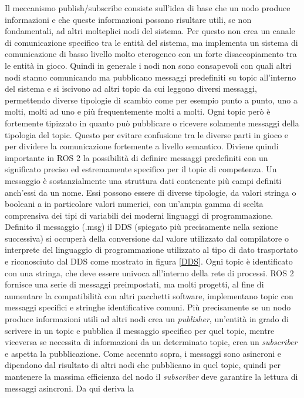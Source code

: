 \documentclass[a4paper,11 pt,oneside]{book}
\theoremstyle{definition}
\begin{document}
Il meccanismo publish/subscribe consiste sull'idea di base che un nodo produce informazioni e che queste informazioni possano risultare utili, se non fondamentali, ad altri molteplici nodi del sistema. Per questo non crea un canale di comunicazione specifico tra le entità del sistema, ma implementa un sistema di comunicazione di basso livello molto eterogeneo con un forte disaccopiamento tra le entità in gioco.
Quindi in generale i nodi non sono consapevoli con quali altri nodi stanno comunicando ma pubblicano messaggi predefiniti su topic all’interno del sistema e si iscivono ad altri topic da cui leggono diversi messaggi, permettendo diverse tipologie di scambio come per esempio punto a punto, uno a molti, molti ad uno e più frequentemente molti a molti. Ogni topic però è fortemente tipizzato in quanto può pubblicare o ricevere solamente messaggi della tipologia del topic. Questo per evitare confusione tra le diverse parti in gioco e per dividere la comunicazione fortemente a  livello semantico. Diviene quindi importante in ROS 2 la possibilità di definire messaggi predefiniti con un significato preciso ed estremamente specifico per il topic di competenza. Un messaggio è sostanzialmente una struttura dati contenente più campi definiti anch'essi da un nome. Essi possono essere di diverse tipologie, da valori stringa o booleani a in particolare valori numerici, con un'ampia gamma di scelta comprensiva dei tipi di variabili dei moderni linguaggi di programmazione.
Definito il messaggio (.msg) il DDS (spiegato più precisamente nella sezione successiva) si occuperà della conversione dal valore utilizzato dal compilatore o interprete del linguaggio di programmazione utilizzato al tipo di dato trasportato e riconosciuto dal DDS come mostrato in figura \ref{DDS}. 
Ogni topic è identificato con una stringa, che deve essere univoca all'interno della rete di processi. ROS 2 fornisce una serie di messaggi preimpostati, ma molti progetti, al fine di aumentare la compatibilità con altri pacchetti software, implementano topic con messaggi specifici e stringhe identificative comuni.
Più precisamente se un nodo produce informazioni utili ad altri nodi crea un \emph{publisher}, un'entità in grado di scrivere in un topic e  pubblica il messaggio specifico per quel topic, mentre viceversa se necessita di informazioni da un determinato topic, crea un \emph{subscriber} e aspetta la pubblicazione. Come accennto sopra, i messaggi sono asincroni e dipendono dal risultato di altri nodi che pubblicano in quel topic, quindi per mantenere la massima efficienza del nodo il \emph{subscriber} deve garantire la lettura di messaggi asincroni. Da qui deriva la
\end{document}
